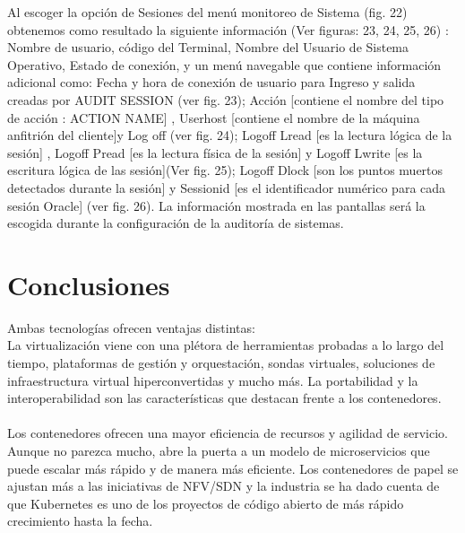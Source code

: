 \documentclass[twoside,twocolumn]{article}
\begin{document}
\begin{flushright}
\begin{itemize}
Al escoger la opción de Sesiones del menú monitoreo de Sistema (fig. 22) obtenemos como resultado la siguiente información (Ver figuras: 23, 24, 25, 26) : Nombre de usuario, código del Terminal, Nombre del Usuario de Sistema Operativo, Estado de conexión, y un menú navegable que contiene información adicional como: Fecha y hora de conexión de usuario para Ingreso y salida creadas por AUDIT SESSION (ver fig. 23); Acción [contiene el nombre del tipo de acción : ACTION NAME] , Userhost [contiene el nombre de la máquina anfitrión del cliente]y Log off (ver fig. 24); Logoff Lread [es la lectura lógica de la sesión] , Logoff Pread [es la lectura física de la sesión] y Logoff Lwrite [es la escritura lógica de las sesión](Ver fig. 25); Logoff Dlock [son los puntos muertos detectados durante la sesión] y Sessionid [es el identificador numérico para cada sesión Oracle] (ver fig. 26). La información mostrada en las pantallas será la escogida durante la configuración de la auditoría de sistemas.
\section{Conclusiones}

Ambas tecnologías ofrecen ventajas distintas:
\textbf{}\\
La virtualización viene con una plétora de herramientas probadas a lo largo del tiempo, plataformas de gestión y orquestación, sondas virtuales, soluciones de infraestructura virtual hiperconvertidas y mucho más. La portabilidad y la interoperabilidad son las características que destacan frente a los contenedores.
\textbf{}\\
\textbf{}\\
Los contenedores ofrecen una mayor eficiencia de recursos y agilidad de servicio. Aunque no parezca mucho, abre la puerta a un modelo de microservicios que puede escalar más rápido y de manera más eficiente. Los contenedores de papel se ajustan más a las iniciativas de NFV/SDN y la industria se ha dado cuenta de que Kubernetes es uno de los proyectos de código abierto de más rápido crecimiento hasta la fecha.


\end{itemize}
\end{flushright}
\end{document}
